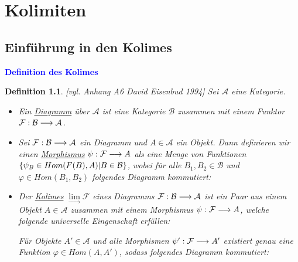 \documentclass[10pt,a4paper]{report}
\newcommand{\ModulsOfDifferenzials}{David Eisenbud 1994}
\newcounter{Aussage}[chapter]
\newtheorem{definition}[Aussage]{Definition}
\newcommand{\functionfront}[3]{\nolinebreak{#1:#2 \longrightarrow #3}}
\newcommand{\colimes}[0]{\lim\limits_{ \longrightarrow }}
\begin{document}
\chapter{Kolimiten}
\section{Einführung in den Kolimes}
\textcolor{blue}{\textbf{Definition des Kolimes}}
\begin{definition}\label{Definition des Kolimes} \textit{[vgl. Anhang A6 \ModulsOfDifferenzials]}
Sei $\mathcal{A}$ eine Kategorie.
\begin{itemize}
\item Ein \underline{Diagramm} über $\mathcal{A}$ ist eine Kategorie $\mathcal{B}$ zusammen mit einem Funktor $\functionfront{\mathcal{F}}{\mathcal{B}}{\mathcal{A}}$.
\item Sei $\functionfront{\mathcal{F}}{\mathcal{B}}{\mathcal{A}}$ ein Diagramm und $A \in \mathcal{A}$ ein Objekt. Dann definieren wir einen \underline{Morphismus} $\functionfront{\psi}{\mathcal{F}}{A}$ als eine Menge von Funktionen 
$\nolinebreak{\lbrace \psi_B \in Hom(F(B),A) \vert B \in \mathcal{B} \rbrace}$, wobei für alle $B_1,B_2 \in \mathcal{B}$ und $\varphi \in Hom(B_1,B_2)$ folgendes Diagramm kommutiert:
\begin{center}
\end{center}
\item Der \underline{Kolimes} $\colimes \mathcal{F}$ eines Diagramms $\functionfront{\mathcal{F}}{\mathcal{B}}{\mathcal{A}}$ ist ein Paar aus einem Objekt $A \in \mathcal{A}$ zusammen mit einem Morphismus $\functionfront{\psi}{\mathcal{F}}{A}$, welche folgende universelle Eingenschaft erfüllen:
\begin{center}
Für Objekte $A' \in \mathcal{A}$ und alle Morphismen $\functionfront{\psi '}{\mathcal{F}}{A'}$ existiert genau eine Funktion $\varphi \in Hom(A,A')$, sodass folgendes Diagramm kommutiert:
\end{center}
\end{itemize}
\end{definition}
\end{document}
